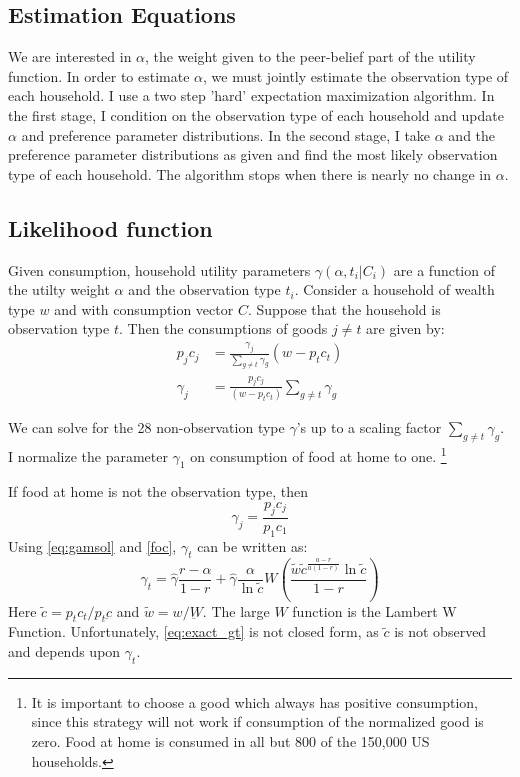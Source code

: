 \documentclass[12pt]{article}
\begin{document}
\subsection{Estimation Equations}
We are interested in $\alpha$, the weight given to the peer-belief part of the utility function.  In order to estimate $\alpha$, we must jointly estimate the observation type of each household.  I use a two step 'hard' expectation maximization algorithm.  In the first stage, I condition on the observation type of each household and update $\alpha$ and preference parameter distributions.  In the second stage, I take $\alpha$ and the preference parameter distributions as given and find the most likely observation type of each household.  The algorithm stops when there is nearly no change in $\alpha$.

\subsection{Likelihood function}

Given consumption, household utility parameters $\gamma(\alpha,t_i|C_i)$ are a function of the utilty weight $\alpha$ and the observation type $t_i$.  Consider a household of wealth type $w$ and with consumption vector $C$.  Suppose that the household is observation type $t$.
Then the consumptions of goods $j\neq t$ are given by:
\begin{align}
	\label{eq:sgd}
	p_jc_j &= \frac{\gamma_j}{\sum_{g\neq t}\gamma_g}  \left(w-  p_t c_t\right)\\
	\label{eq:sgdsol}
	\gamma_j &= \frac{p_j c_j}{\left(w- p_t c_t\right)} \sum_{g\neq t}\gamma_g  
\end{align}

We can solve for the 28 non-observation type $\gamma$'s up to a scaling factor $\sum_{g\neq t}\gamma_g$.
I normalize the parameter $\gamma_1$ on consumption of food at home to one. 
\footnote{It is important to choose a good which always has positive consumption, since this strategy will not work if consumption of the normalized good is zero.  
Food at home is consumed in all but 800 of the 150,000 US households.}

If food at home is not the observation type, then 
\begin{equation}
	\label{eq:gamsol}
	\gamma_j = \frac{p_j c_j}{p_1 c_1}
\end{equation}
Using \eqref{eq:gamsol} and \eqref{foc}, $\gamma_t$ can be written as:
\begin{equation}
    \label{eq:exact_gt}
    \gamma_t = \hat{\gamma} \frac{r - \alpha}{1 - r} + \hat{\gamma}\frac{\alpha}{\ln \tilde{c}} W\left(\frac{\tilde{w} \tilde{c}^{\frac{a - r}{a(1 - r)}}\ln \tilde{c}}{1 - r}\right)
\end{equation}
Here $\tilde{c} = p_t c_t / p_t \underbar{c}$ and $\tilde{w} = w / \underbar{W}$. The large $W$ function is the Lambert W Function.  Unfortunately, \eqref{eq:exact_gt} is not closed form, as $\tilde{c}$ is not observed and depends upon $\gamma_t$.
\end{document}
